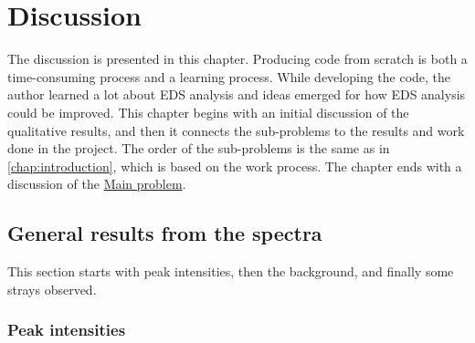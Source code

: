 \chapter{Discussion}
\label{chap:discussion}




The discussion is presented in this chapter.
Producing code from scratch is both a time-consuming process and a learning process.
While developing the code, the author learned a lot about EDS analysis and  ideas emerged for how EDS analysis could be improved.
This chapter begins with an initial discussion of the qualitative results, and then it connects the sub-problems to the results and work done in the project.
The order of the sub-problems is the same as in \cref{chap:introduction}, which is based on the work process.
The chapter ends with a discussion of the \hyperref[mainproblem]{Main problem}.



\section{General results from the spectra}
\label{sec:discussion:general}

This section starts with peak intensities, then the background, and finally some strays observed.


\subsection{Peak intensities}
\label{sec:discussion:general:intensities}

